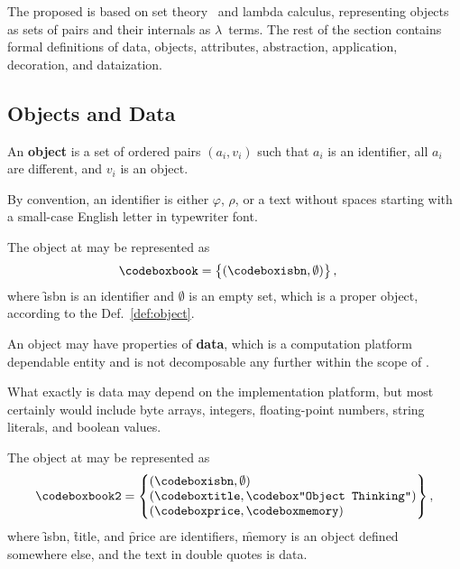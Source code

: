 The proposed \phic{} is based on set theory~\citep{jech2013set} and lambda calculus,
representing objects as sets of pairs and their internals as $\lambda$~terms.
The rest of the section contains formal definitions of
data, objects, attributes, abstraction, application, decoration, and dataization.

\subsection{Objects and Data}

\begin{eodefinition}\label{def:object}
An \textbf{object} is a set of ordered pairs $(a_i, v_i)$ such that
$a_i$ is an identifier, all $a_i$ are different, and $v_i$ is an object.
\end{eodefinition}

By convention, an identifier is either $\varphi$, $\rho$, or a text without
spaces starting with a small-case English letter
in typewriter font.

The object at  may be represented as
\begin{equation}\label{eq:book}
\begin{split}
\f{book} & = \left\{\begin{matrix*}[l]
  (\f{isbn}, \emptyset) \\
\end{matrix*}\right\},
\end{split}
\end{equation}
where \f{isbn} is an identifier and $\emptyset$ is an empty
set, which is a proper object, according to the Def.~\ref{def:object}.

\begin{eodefinition}\label{def:data}
An object may have properties of \textbf{data},
which is a computation platform dependable entity and is not
decomposable any further within the scope of \phic{}.
\end{eodefinition}

What exactly is data may depend on the
implementation platform, but most certainly would include
byte arrays, integers, floating-point numbers,
string literals, and boolean values.

The object at  may be represented as
\begin{equation}\label{eq:book2}
\begin{split}
\f{book2} & = \left\{\begin{matrix*}[l]
  (\f{isbn}, \emptyset) \\
  (\f{title}, \f{"Object Thinking"}) \\
  (\f{price}, \f{memory}) \\
\end{matrix*}\right\}, \\
\end{split}
\end{equation}
where \f{isbn}, \f{title}, and \f{price} are identifiers,
\f{memory} is an object defined somewhere else,
and the text in double quotes is data.

